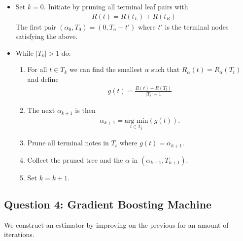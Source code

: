 \documentclass[
]{book}
\providecommand{\tightlist}{%
  \setlength{\itemsep}{0pt}\setlength{\parskip}{0pt}}
\begin{document}
\begin{itemize}
\tightlist
\item
  Set \(k=0\). Initiate by pruning all terminal leaf pairs with
  \begin{align*}
    R(t)=R(t_L)+R(t_R)
    \end{align*}
  The first pair \((\alpha_0,T_0)=(0,T_n-t')\) where \(t'\) is the terminal nodes satisfying the above.
\item
  While \(\vert T_k\vert >1\) do:

  \begin{enumerate}
  \def\labelenumi{(\alph{enumi})}
  \tightlist
  \item
    For all \(t\in T_k\) we can find the smallest \(\alpha\) such that \(R_\alpha(t)=R_\alpha(T_t)\) and define
    \begin{align*}
    g(t)=\frac{R(t)-R(T_t)}{\vert T_t\vert -1}
    \end{align*}
  \item
    The next \(\alpha_{k+1}\) is then
    \begin{align*}
    \alpha_{k+1}=\underset{t\in T_k}{\text{arg min}}(g(t)).
    \end{align*}
  \item
    Prune all terminal notes in \(T_t\) where \(g(t)=\alpha_{k+1}\).
  \item
    Collect the pruned tree and the \(\alpha\) in \((\alpha_{k+1},T_{k+1})\).
  \item
    Set \(k=k+1\).
  \end{enumerate}
\end{itemize}

\hypertarget{question-4-gradient-boosting-machine}{%
\subsection{Question 4: Gradient Boosting Machine}\label{question-4-gradient-boosting-machine}}

We construct an estimator by improving on the previous for an amount of iterations.
\end{document}
